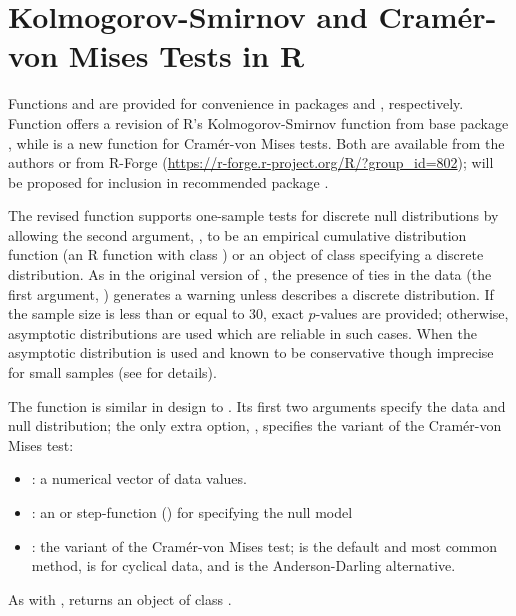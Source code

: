 \section{Kolmogorov-Smirnov and Cram\'{e}r-von Mises Tests in R}

Functions  and  are provided for
convenience in packages  and , respectively.
Function  offers a revision of
R's Kolmogorov-Smirnov function  from base
package , while  is a new
function for Cram\'{e}r-von Mises tests.
Both are available from the authors
or from R-Forge (\url{https://r-forge.r-project.org/R/?group_id=802});
 will be proposed for inclusion in recommended
package .

The revised  function supports one-sample tests for discrete
null distributions by allowing the second argument, , to be
an empirical cumulative distribution function (an R function
with class ) or an object of class  specifying
a discrete distribution.  As in the original version of ,
the presence of ties in the data (the first argument, ) generates a
warning unless  describes a discrete distribution.  
If the sample size is less than or equal to 30, exact $p$-values are provided;
otherwise, asymptotic distributions
are used which are reliable in such cases.
When  the asymptotic distribution is used and known
to be conservative though imprecise for small samples (see \cite{Conover1972}
for details).

The function  is similar in design
to .  Its first two
arguments specify the data and null distribution; the only extra option,
, specifies the variant of the Cram\'{e}r-von Mises test:
\begin{itemize}
\item {}: a numerical vector of data values.
\item {}: an  or step-function () for specifying
the null model
\item {}: the variant of the Cram\'{e}r-von Mises test; 
is the default and most common method,  is for cyclical data,
and  is the Anderson-Darling alternative.
\end{itemize}
As with ,  returns an object of class 
.

